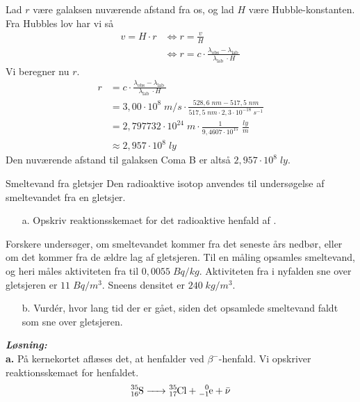 \documentclass{report}
\newcommand{\sol}{\setlength{\parindent}{0cm}\textbf{\textit{Løsning:}}\setlength{\parindent}{1cm}}
\begin{document}
Lad $r$ være galaksen nuværende afstand fra os, og lad $H$ være Hubble-konstanten.
Fra Hubbles lov har vi så
\begin{equation*}
\begin{split}
v=H \cdot r &\iff r=\frac{v}{H}\\
&\iff r=c \cdot \frac{\lambda _{\text{obs} }-\lambda _{\text{lab } }}{\lambda _{\text{lab } } \cdot H}
\end{split}
\end{equation*}
Vi beregner nu $r$.
\begin{equation*}
\begin{split}
r&=c \cdot \frac{\lambda _{\text{obs} }-\lambda _{\text{lab } }}{\lambda _{\text{lab } } \cdot H}\\
&=3,00 \cdot 10^8 \;\unit{m/s} \cdot \frac{528,6 \;\unit{nm} -517,5 \;\unit{nm} }{517,5 \;\unit{nm} \cdot 2,3 \cdot 10 ^{-18} \;\unit{s ^{-1}} }\\
&= 2,797732 \cdot 10 ^{24} \;\unit{m} \cdot \frac{1}{9,4607 \cdot 10 ^{15} } \;\unit{\frac{ly}{m}} \\
&\approx 2,957 \cdot 10^8 \;\unit{ly} 
\end{split}
\end{equation*}
Den nuværende afstand til galaksen Coma B er altså $2,957 \cdot 10^8 \;\unit{ly} $.
\begin{question}{Smeltevand fra gletsjer}{}
 Den radioaktive isotop  anvendes til undersøgelse af smeltevandet fra en gletsjer.
 \begin{itemize}
  \item[a.] Opskriv reaktionsskemaet for det radioaktive henfald af .
 \end{itemize}
Forskere undersøger, om smeltevandet kommer fra det seneste års nedbør, eller om det kommer fra de ældre lag af gletsjeren. 
Til en måling opsamles smeltevand, og heri måles aktiviteten fra  til $0,0055 \;\unit{Bq/kg}$.
Aktiviteten fra  i nyfalden sne over gletsjeren er $11 \;\unit{Bq/m^3}$. 
Sneens densitet er $240 \;\unit{kg/m^3}$.
\begin{itemize}
  \item[b.] Vurdér, hvor lang tid der er gået, siden det opsamlede smeltevand faldt som sne over gletsjeren. 
\end{itemize}
\end{question}
\sol \\
\textbf{a.}
På kernekortet aflæses det, at  henfalder ved $\beta^-$-henfald.
Vi opskriver reaktionsskemaet for henfaldet.
\begin{equation*}
\begin{split}
\ce{^35_16S -> ^35_17Cl + ^0_-1e + \bar{\nu }} 
\end{split}
\end{equation*}
\end{document}
